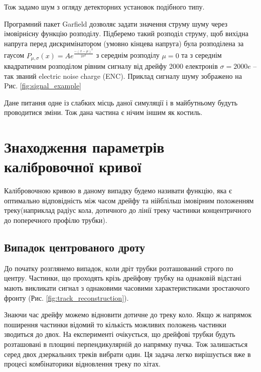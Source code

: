 \documentclass[]{article}
\begin{document}
	Тож задамо шум з огляду детекторних установок подібного типу.
	
	Програмний пакет Garfield дозволяє задати значення струму шуму через імовірнісну функцію розподілу. Підберемо такий розподіл струму, щоб вихідна напруга перед дискримінатором (умовно кінцева напруга) була розподілена за гаусом 
	$P_{\mu,\sigma}(x) = Ae^{\frac{-(x-\mu)^2}{2\sigma^2}}$ 
	з середнім розподілу $\mu=0$ та з середнім квадратичним розподілом рівним сигналу від дрейфу 2000 електронів $ \sigma = 2000e$ -- так званий electric noise charge (ENC). Приклад сигналу шуму зображено на Pис. \ref{fig:signal_example}
	
	Дане питання одне із слабких місць даної симуляції і в майбутньому будуть проводитися зміни. Тож дана частина є нічим іншим як костиль.

	
	\section{Знаходження параметрів калібровочної кривої}
	
	Калібровочною кривою в даному випадку будемо називати функцію, яка є оптимально відповідність між часом дрейфу та нійблільш імовірним положенням треку(наприклад радіус кола, дотичного до лінії треку частинки концентричного до поперечного профілю трубки).\\
		
	\subsection{Випадок центрованого дроту}
	До початку розглянемо випадок, коли дріт трубки розташований строго по центру. Частинки, що проходять крізь дрейфову трубку на однаковій відстані мають викликати сигнал з однаковими часовими характеристиками зростаючого фронту (Рис. \ref{fig:track_reconstruction}). 
	
	Знаючи час дрейфу можемо відновити дотичне до треку коло. Якщо ж напрямок поширення частинки відомий то кількість можливих положень частинки зводиться до двох. На експерименті очікується, що дрейфові трубки будуть розташовані в площині перпендикулярній до напрямку пучка. Тож залишається серед двох дзеркальних треків вибрати один. Ця задача легко вирішується вже в процесі комбінаторики відновлення треку по хітах.
	
\end{document}
